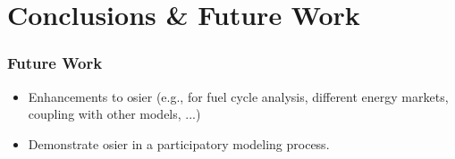 \section{Conclusions \& Future Work}

\begin{frame}
    \frametitle{Future Work}

    \begin{itemize}
        \item Enhancements to \gls{osier} (e.g., for fuel cycle analysis, different energy markets, coupling with
        other models, ...)
        \item Demonstrate \gls{osier} in a participatory modeling process.
    \end{itemize}
\end{frame}